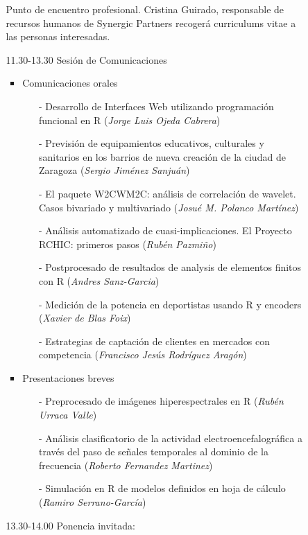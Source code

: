 \begin{itemize}
\begin{itemize}
\begin{itemize}
        Punto de encuentro profesional. 
        Cristina Guirado, responsable de recursos humanos de Synergic 
        Partners recogerá curriculums vitae a las personas interesadas.
    \item[]11.30-13.30 Sesión de Comunicaciones
    \begin{itemize}
    \item Comunicaciones orales
      \begin{enumerate}
      \item[-] Desarrollo de Interfaces Web utilizando programación 
      funcional en R (\emph{Jorge Luis Ojeda Cabrera})
      \item[-] Previsión de equipamientos educativos, culturales y sanitarios 
      en los barrios de nueva creación de la ciudad de Zaragoza 
      (\emph{Sergio Jiménez Sanjuán})
      \item[-] El paquete W2CWM2C: análisis de correlación de wavelet. 
      Casos bivariado y multivariado (\emph{Josué M. Polanco Martínez})
      \item[-] Análisis automatizado de cuasi-implicaciones. El Proyecto 
      RCHIC: primeros pasos (\emph{Rubén Pazmiño})
      \item[-] Postprocesado de resultados de analysis de elementos 
      finitos con R (\emph{Andres Sanz-Garcia})
      \item[-] Medición de la potencia en deportistas usando R y 
      encoders (\emph{Xavier de Blas Foix})
      \item[-] Estrategias de captación de clientes en mercados con 
      competencia (\emph{Francisco Jesús Rodríguez Aragón})
      \end{enumerate}
    \item  Presentaciones breves
      \begin{enumerate}
      \item[-] Preprocesado de imágenes hiperespectrales en R 
      (\emph{Rubén Urraca Valle})
      \item[-] Análisis clasificatorio de la actividad electroencefalográfica 
      a través del paso de señales temporales al dominio de la frecuencia 
      (\emph{Roberto Fernandez Martinez})
      \item[-] Simulación en R de modelos definidos en hoja de cálculo 
      (\emph{Ramiro Serrano-García})
      \end{enumerate}
    \end{itemize}
    \item[]13.30-14.00 Ponencia invitada:


\end{itemize}
\end{itemize}
\end{itemize}

